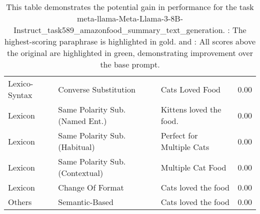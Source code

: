 \begin{table*}
\begin{tabular}{l l l r}
    Lexico-Syntax & Converse Substitution & Cats Loved Food & {0.00} \\
    Lexicon & Same Polarity Sub. (Named Ent.) & Kittens loved the food. & {0.00} \\
    Lexicon & Same Polarity Sub. (Habitual) & Perfect for Multiple Cats & {0.00} \\
    Lexicon & Same Polarity Sub. (Contextual) & Multiple Cat Food & {0.00} \\
    Lexicon & Change Of Format & Cats loved the food & {0.00} \\
    Others & Semantic-Based & Cats loved the food & {0.00} \\
    \bottomrule
    \end{tabular}

    \caption{This table demonstrates the potential gain in performance for the task meta-llama-Meta-Llama-3-8B-Instruct_task589_amazonfood_summary_text_generation. : The highest-scoring paraphrase is highlighted in gold.  and : All scores above the original are highlighted in green, demonstrating improvement over the base prompt.}
    \label{ap:potential_gain_explained}
\end{table*}
